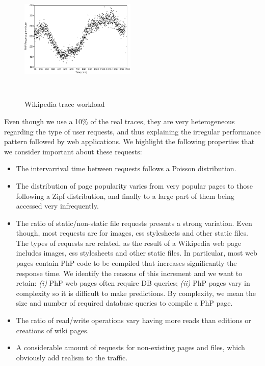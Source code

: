 \begin{figure}
\begin{center}
\includegraphics[width=0.49\textwidth, height=6cm]{./images/traceWorkload}
\end{center}
\caption{Wikipedia trace workload}
\label{workload}
\end{figure}

Even though we use a 10\% of the real traces, they are very heterogeneous regarding the type of user requests, and thus explaining the irregular performance pattern followed by web applications. 
We highlight the following properties that we consider important about these requests: 

\begin{itemize}
\item The intervarrival time between requests follows a Poisson distribution.

\item The distribution of page popularity varies from very popular pages to those following a Zipf distribution, and finally to a large part of them being accessed very infrequently.

\item The ratio of static/non-static file requests presents a strong variation. Even though, most requests are for images, css stylesheets and other static files. The types of requests are related, as the result of a Wikipedia web page includes images, css stylesheets and other static files. In particular, most web pages contain PhP code to be compiled that increases significantly the response time. We identify the reasons of this increment and we want to retain: \emph{(i)} PhP web pages often require DB queries; \emph{(ii)} PhP pages vary in complexity so it is difficult to make predictions. By complexity, we mean the size and number of required database queries to compile a PhP page.

\item The ratio of read/write operations vary having more reads than editions or creations of wiki pages.

\item A considerable amount of requests for non-existing pages and files, which obviously add realism to the traffic.

\end{itemize}


